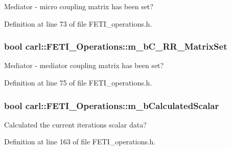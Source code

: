 Mediator -\/ micro coupling matrix has been set? 



Definition at line 73 of file F\+E\+T\+I\+\_\+operations.\+h.

\hypertarget{classcarl_1_1_f_e_t_i___operations_a1f272a523aba46755b2883394947bde0}{}
\subsubsection[{m\+\_\+b\+C\+\_\+\+R\+R\+\_\+\+Matrix\+Set}]{\setlength{\rightskip}{0pt plus 5cm}bool carl\+::\+F\+E\+T\+I\+\_\+\+Operations\+::m\+\_\+b\+C\+\_\+\+R\+R\+\_\+\+Matrix\+Set\hspace{0.3cm}{\ttfamily [protected]}}\label{classcarl_1_1_f_e_t_i___operations_a1f272a523aba46755b2883394947bde0}


Mediator -\/ mediator coupling matrix has been set? 



Definition at line 75 of file F\+E\+T\+I\+\_\+operations.\+h.

\hypertarget{classcarl_1_1_f_e_t_i___operations_a2e115c189d8adcfc8451c505a3a9cb05}{}
\subsubsection[{m\+\_\+b\+Calculated\+Scalar}]{\setlength{\rightskip}{0pt plus 5cm}bool carl\+::\+F\+E\+T\+I\+\_\+\+Operations\+::m\+\_\+b\+Calculated\+Scalar\hspace{0.3cm}{\ttfamily [protected]}}\label{classcarl_1_1_f_e_t_i___operations_a2e115c189d8adcfc8451c505a3a9cb05}


Calculated the current iterations scalar data? 



Definition at line 163 of file F\+E\+T\+I\+\_\+operations.\+h.

\hypertarget{classcarl_1_1_f_e_t_i___operations_a4e8e38670cc41dc8de9e9465eda687ba}{}
